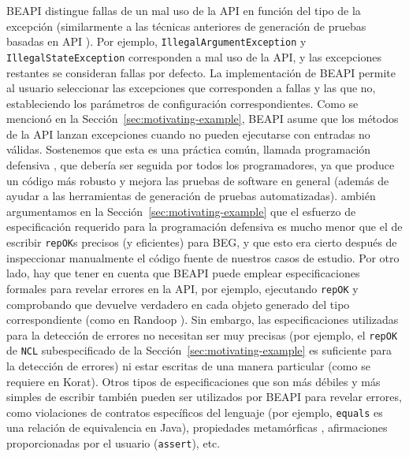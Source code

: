 \textsf{BEAPI} distingue fallas de un mal uso de la API en función del tipo de la excepción (similarmente a las técnicas anteriores de generación de pruebas basadas en API \cite{Pacheco07}). Por ejemplo, \texttt{IllegalArgumentException} y \texttt{IllegalStateException} corresponden a mal uso de la API, y las excepciones restantes se consideran fallas por defecto. La implementación de \textsf{BEAPI} permite al usuario seleccionar las excepciones que corresponden a fallas y las que no, estableciendo los parámetros de configuración correspondientes. Como se mencionó en la Sección~\ref{sec:motivating-example}, \textsf{BEAPI} asume que los métodos de la API lanzan excepciones cuando no pueden ejecutarse con entradas no válidas. Sostenemos que esta es una práctica común, llamada programación defensiva \cite{Liskov00}, que debería ser seguida por todos los programadores, ya que produce un código más robusto y mejora las pruebas de software en general \cite{Ammann16} (además de ayudar a las herramientas de generación de pruebas automatizadas). ambién argumentamos en la Sección~\ref{sec:motivating-example} que el esfuerzo de especificación requerido para la programación defensiva es mucho menor que el de escribir \texttt{repOK}s precisos (y eficientes) para BEG, y que esto era cierto después de inspeccionar manualmente el código fuente de nuestros casos de estudio. Por otro lado, hay que tener en cuenta que \textsf{BEAPI} puede emplear especificaciones formales para revelar errores en la API, por ejemplo, ejecutando \texttt{repOK} y comprobando que devuelve verdadero en cada objeto generado del tipo correspondiente (como en Randoop \cite{Pacheco07}). Sin embargo, las especificaciones utilizadas para la detección de errores no necesitan ser muy precisas (por ejemplo, el \texttt{repOK} de \texttt{NCL} subespecificado de la Sección~\ref{sec:motivating-example} es suficiente para la detección de errores) ni estar escritas de una manera particular (como se requiere en \textsf{Korat}). Otros tipos de especificaciones que son más débiles y más simples de escribir también pueden ser utilizados por \textsf{BEAPI} para revelar errores, como violaciones de contratos específicos del lenguaje (por ejemplo, \texttt{equals} es una relación de equivalencia en Java), propiedades metamórficas \cite{Chen19}, afirmaciones proporcionadas por el usuario (\texttt{assert}), etc.

